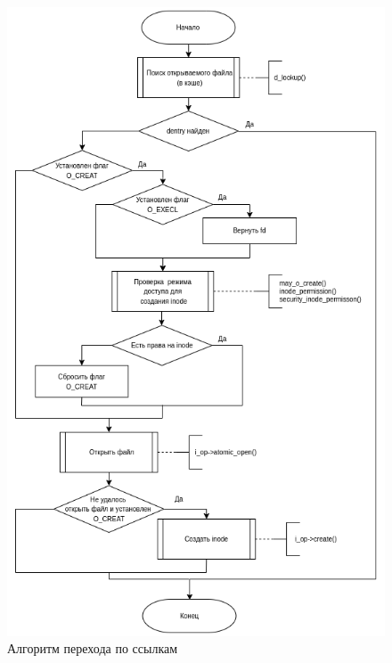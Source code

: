 \documentclass[12pt,a4paper]{scrreprt}
\begin{document}
\begin{figure}[H]
	\centering
	\includegraphics[scale=0.7]{pics/lookup_open.png}
	\caption{Алгоритм перехода по ссылкам}
\end{figure}

%	
\end{document}
